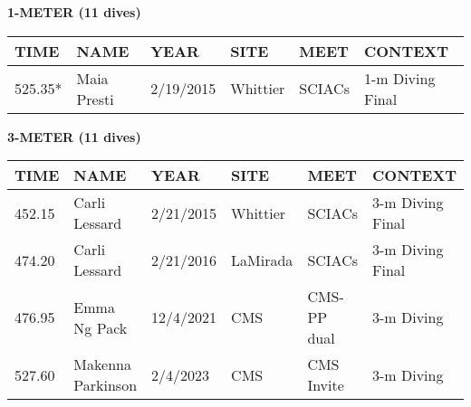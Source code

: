 \vspace{0.4cm}

\begin{center}
\begin{minipage}[t]{0.7\textwidth}
\centering
\textbf{1-METER (11 dives)}\\[0.05cm]
\begin{tabular}{@{}p{1.8cm}p{2.8cm}p{1.2cm}p{1.4cm}p{1.4cm}p{2.0cm}@{}}
\hline
\textbf{TIME} & \textbf{NAME} & \textbf{YEAR} & \textbf{SITE} & \textbf{MEET} & \textbf{CONTEXT} \\
\hline
525.35* & Maia Presti & 2/19/2015 & Whittier & SCIACs & 1-m Diving Final \\
\hline
\end{tabular}
\end{minipage}
\end{center}

\vspace{0.4cm}

\begin{center}
\begin{minipage}[t]{0.7\textwidth}
\centering
\textbf{3-METER (11 dives)}\\[0.05cm]
\begin{tabular}{@{}p{1.8cm}p{2.8cm}p{1.2cm}p{1.4cm}p{1.4cm}p{2.0cm}@{}}
\hline
\textbf{TIME} & \textbf{NAME} & \textbf{YEAR} & \textbf{SITE} & \textbf{MEET} & \textbf{CONTEXT} \\
\hline
452.15 & Carli Lessard & 2/21/2015 & Whittier & SCIACs & 3-m Diving Final \\
474.20 & Carli Lessard & 2/21/2016 & LaMirada & SCIACs & 3-m Diving Final \\
476.95 & Emma Ng Pack & 12/4/2021 & CMS & CMS-PP dual & 3-m Diving \\
527.60 & Makenna Parkinson & 2/4/2023 & CMS & CMS Invite & 3-m Diving \\
\hline
\end{tabular}
\end{minipage}
\end{center}

\vspace{0.4cm}

